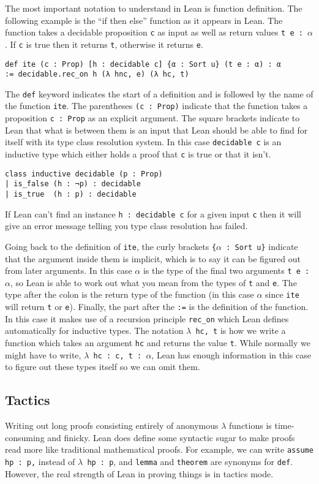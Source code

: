 \documentclass{article}
\renewcommand{\a}{\alpha}
\newcommand{\ct}{\texttt}
\begin{document}
The most important notation to understand in Lean is function definition.
The following example is the ``if then else'' function as it appears in Lean.
The function takes a decidable proposition \ct{c} as input as well as return values \ct{t e : $\a$}.
If \ct{c} is true then it returns \ct{t}, otherwise it returns \ct{e}.
\begin{lstlisting}
def ite (c : Prop) [h : decidable c] {α : Sort u} (t e : α) : α 
:= decidable.rec_on h (λ hnc, e) (λ hc, t)
\end{lstlisting}
The \ct{def} keyword indicates the start of a definition and is followed by the name of the function \ct{ite}.
The parentheses \ct{(c : Prop)} indicate that the function takes a proposition \ct{c : Prop} as an explicit argument.
The square brackets indicate to Lean that what is between them is an input that Lean should be able to find for itself with its type class resolution system.
In this case \ct{decidable c} is an inductive type which either holds a proof that \ct{c} is true or that it isn't.
\begin{lstlisting}
class inductive decidable (p : Prop)
| is_false (h : ¬p) : decidable
| is_true  (h : p) : decidable

\end{lstlisting}
If Lean can't find an instance \ct{h : decidable c} for a given input \ct{c} then it will give an error message telling you type class resolution has failed.

Going back to the definition of \ct{ite}, the curly brackets \ct{\{$\a$ : Sort u\}} indicate that the argument inside them is implicit, which is to say it can be figured out from later arguments.
In this case $\a$ is the type of the final two arguments \ct{t e : $\a$}, so Lean is able to work out what you mean from the types of \ct{t} and \ct{e}.
The type after the colon is the return type of the function (in this case \ct{$\a$} since \ct{ite} will return \ct{t} or \ct{e}).
Finally, the part after the \ct{:=} is the definition of the function. 
In this case it makes use of a recursion principle \ct{rec\_on} which Lean defines automatically for inductive types.
The notation \ct{$\lambda$ hc, t} is how we write a function which takes an argument \ct{hc} and returns the value \ct{t}.
While normally we might have to write, \ct{$\lambda$ hc : c, t : $\a$}, Lean has enough information in this case to figure out these types itself so we can omit them.


\subsection{Tactics}
Writing out long proofs consisting entirely of anonymous $\lambda$ functions is time-consuming and finicky.
Lean does define some syntactic sugar to make proofs read more like traditional mathematical proofs.
For example, we can write \ct{assume hp : p,} instead of \ct{$\lambda$ hp : p}, and \ct{lemma} and \ct{theorem} are synonyms for \ct{def}.
However, the real strength of Lean in proving things is in tactics mode.
\end{document}

